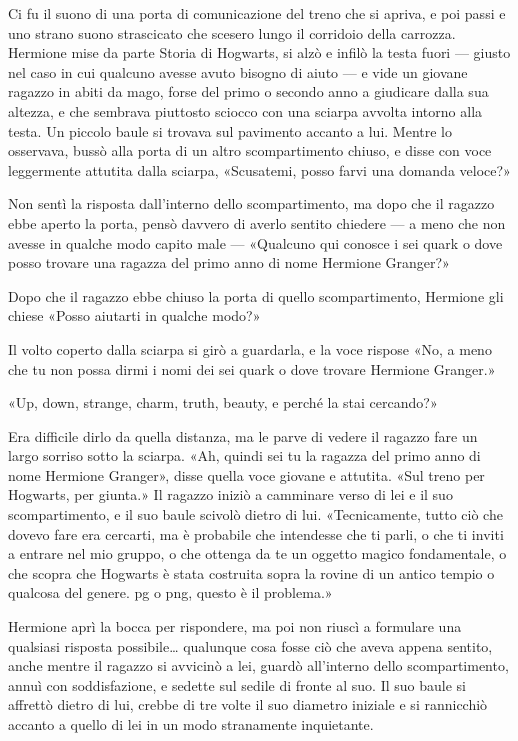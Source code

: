 Ci fu il suono di una porta di comunicazione del treno che si apriva, e poi passi e uno strano suono strascicato che scesero lungo il corridoio della carrozza. Hermione mise da parte Storia di Hogwarts, si alzò e infilò la testa fuori — giusto nel caso in cui qualcuno avesse avuto bisogno di aiuto — e vide un giovane ragazzo in abiti da mago, forse del primo o secondo anno a giudicare dalla sua altezza, e che sembrava piuttosto sciocco con una sciarpa avvolta intorno alla testa. Un piccolo baule si trovava sul pavimento accanto a lui. Mentre lo osservava, bussò alla porta di un altro scompartimento chiuso, e disse con voce leggermente attutita dalla sciarpa, «Scusatemi, posso farvi una domanda veloce?»

Non sentì la risposta dall’interno dello scompartimento, ma dopo che il ragazzo ebbe aperto la porta, pensò davvero di averlo sentito chiedere — a meno che non avesse in qualche modo capito male — «Qualcuno qui conosce i sei quark o dove posso trovare una ragazza del primo anno di nome Hermione Granger?»

Dopo che il ragazzo ebbe chiuso la porta di quello scompartimento, Hermione gli chiese «Posso aiutarti in qualche modo?»

Il volto coperto dalla sciarpa si girò a guardarla, e la voce rispose «No, a meno che tu non possa dirmi i nomi dei sei quark o dove trovare Hermione Granger.»

«Up, down, strange, charm, truth, beauty, e perché la stai cercando?»

Era difficile dirlo da quella distanza, ma le parve di vedere il ragazzo fare un largo sorriso sotto la sciarpa. «Ah, quindi sei tu la ragazza del primo anno di nome Hermione Granger», disse quella voce giovane e attutita. «Sul treno per Hogwarts, per giunta.» Il ragazzo iniziò a camminare verso di lei e il suo scompartimento, e il suo baule scivolò dietro di lui. «Tecnicamente, tutto ciò che dovevo fare era cercarti, ma è probabile che intendesse che ti parli, o che ti inviti a entrare nel mio gruppo, o che ottenga da te un oggetto magico fondamentale, o che scopra che Hogwarts è stata costruita sopra la rovine di un antico tempio o qualcosa del genere. pg o png, questo è il problema.»

Hermione aprì la bocca per rispondere, ma poi non riuscì a formulare una qualsiasi risposta possibile… qualunque cosa fosse ciò che aveva appena sentito, anche mentre il ragazzo si avvicinò a lei, guardò all’interno dello scompartimento, annuì con soddisfazione, e sedette sul sedile di fronte al suo. Il suo baule si affrettò dietro di lui, crebbe di tre volte il suo diametro iniziale e si rannicchiò accanto a quello di lei in un modo stranamente inquietante.

